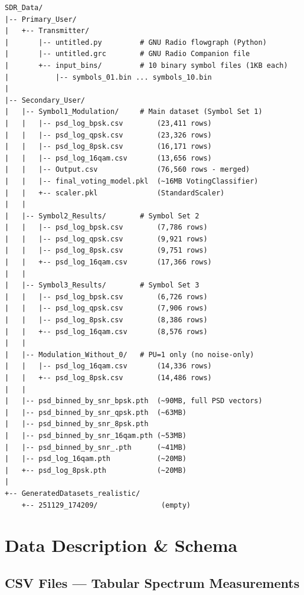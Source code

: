 \documentclass[12pt, a4paper]{article}
\begin{document}
\begin{lstlisting}[caption={Directory Structure of SDR\_Data/}, label=lst:dirtree, language={}]
SDR_Data/
|-- Primary_User/
|   +-- Transmitter/
|       |-- untitled.py         # GNU Radio flowgraph (Python)
|       |-- untitled.grc        # GNU Radio Companion file
|       +-- input_bins/         # 10 binary symbol files (1KB each)
|           |-- symbols_01.bin ... symbols_10.bin
|
|-- Secondary_User/
|   |-- Symbol1_Modulation/     # Main dataset (Symbol Set 1)
|   |   |-- psd_log_bpsk.csv        (23,411 rows)
|   |   |-- psd_log_qpsk.csv        (23,326 rows)
|   |   |-- psd_log_8psk.csv        (16,171 rows)
|   |   |-- psd_log_16qam.csv       (13,656 rows)
|   |   |-- Output.csv              (76,560 rows - merged)
|   |   |-- final_voting_model.pkl  (~16MB VotingClassifier)
|   |   +-- scaler.pkl              (StandardScaler)
|   |
|   |-- Symbol2_Results/        # Symbol Set 2
|   |   |-- psd_log_bpsk.csv        (7,786 rows)
|   |   |-- psd_log_qpsk.csv        (9,921 rows)
|   |   |-- psd_log_8psk.csv        (9,751 rows)
|   |   +-- psd_log_16qam.csv       (17,366 rows)
|   |
|   |-- Symbol3_Results/        # Symbol Set 3
|   |   |-- psd_log_bpsk.csv        (6,726 rows)
|   |   |-- psd_log_qpsk.csv        (7,906 rows)
|   |   |-- psd_log_8psk.csv        (8,386 rows)
|   |   +-- psd_log_16qam.csv       (8,576 rows)
|   |
|   |-- Modulation_Without_0/   # PU=1 only (no noise-only)
|   |   |-- psd_log_16qam.csv       (14,336 rows)
|   |   +-- psd_log_8psk.csv        (14,486 rows)
|   |
|   |-- psd_binned_by_snr_bpsk.pth  (~90MB, full PSD vectors)
|   |-- psd_binned_by_snr_qpsk.pth  (~63MB)
|   |-- psd_binned_by_snr_8psk.pth
|   |-- psd_binned_by_snr_16qam.pth (~53MB)
|   |-- psd_binned_by_snr_.pth      (~41MB)
|   |-- psd_log_16qam.pth           (~20MB)
|   +-- psd_log_8psk.pth            (~20MB)
|
+-- GeneratedDatasets_realistic/
    +-- 251129_174209/               (empty)
\end{lstlisting}


\section{Data Description \& Schema}

\subsection{CSV Files — Tabular Spectrum Measurements}
\end{document}
